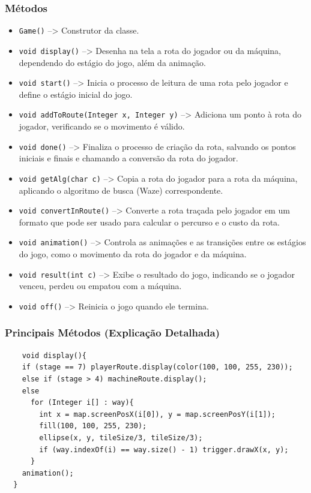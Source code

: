 \documentclass[
	12pt,				%
	oneside,			%
	a4paper,			%
	english,			%
	brazil,				%
	]{abntex2}
\begin{document}
{\subsubsection{Métodos}

\begin{itemize}
    \item \texttt{Game()} --> Construtor da classe.
    \item \texttt{void display()} --> Desenha na tela a rota do jogador ou da máquina, dependendo do estágio do jogo, além da animação.
    \item \texttt{void start()} --> Inicia o processo de leitura de uma rota pelo jogador e define o estágio inicial do jogo.
    \item \texttt{void addToRoute(Integer x, Integer y)} --> Adiciona um ponto à rota do jogador, verificando se o movimento é válido.
    \item \texttt{void done()} --> Finaliza o processo de criação da rota, salvando os pontos iniciais e finais e chamando a conversão da rota do jogador.
    \item \texttt{void getAlg(char c)} --> Copia a rota do jogador para a rota da máquina, aplicando o algoritmo de busca (Waze) correspondente.
    \item \texttt{void convertInRoute()} --> Converte a rota traçada pelo jogador em um formato que pode ser usado para calcular o percurso e o custo da rota.
    \item \texttt{void animation()} --> Controla as animações e as transições entre os estágios do jogo, como o movimento da rota do jogador e da máquina.
    \item \texttt{void result(int c)} --> Exibe o resultado do jogo, indicando se o jogador venceu, perdeu ou empatou com a máquina.
    \item \texttt{void off()} --> Reinicia o jogo quando ele termina.
\end{itemize}

\subsubsection{Principais Métodos (Explicação Detalhada)}


\begin{lstlisting}
    void display(){
    if (stage == 7) playerRoute.display(color(100, 100, 255, 230)); 
    else if (stage > 4) machineRoute.display();
    else 
      for (Integer i[] : way){
        int x = map.screenPosX(i[0]), y = map.screenPosY(i[1]);
        fill(100, 100, 255, 230);
        ellipse(x, y, tileSize/3, tileSize/3);
        if (way.indexOf(i) == way.size() - 1) trigger.drawX(x, y);
      }
    animation();
  }
\end{lstlisting}

}
\end{document}
